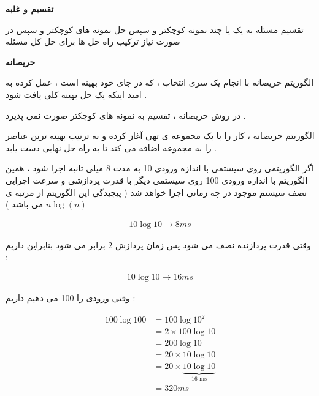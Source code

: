 \documentclass[12pt]{article}
\begin{document}
\begin{tcolorbox}
\textbf{تقسیم و غلبه}

\noindent
 تقسیم مسئله به یک یا چند نمونه کوچکتر و سپس حل نمونه های کوچکتر و سپس در صورت نیاز ترکیب راه حل ها برای حل کل مسئله
\end{tcolorbox}



\begin{tcolorbox}
\textbf{حریصانه}


\noindent
الگوریتم حریصانه با انجام یک سری انتخاب ، که در جای خود بهینه است ، عمل کرده به امید اینکه یک حل بهینه کلی یافت شود .


\noindent
در روش حریصانه ، تقسیم به نمونه های کوچکتر صورت نمی پذیرد .

\noindent
الگوریتم حریصانه ، کار را با یک مجموعه ی تهی آغاز کرده و به ترتیب بهینه ترین عناصر را به مجموعه اضافه می کند تا به راه حل نهایی دست یابد .

\end{tcolorbox}



\vspace{30pt}


\newpage

\noindent
اگر الگوریتمی روی سیستمی با اندازه ورودی 10 به مدت 8 میلی ثانیه اجرا شود ، همین الگوریتم با اندازه ورودی 100 روی سیستمی دیگر با قدرت پردازشی و سرعت اجرایی نصف سیستم موجود در چه زمانی اجرا خواهد شد ( پیچیدگی این الگوریتم از مرتبه ی 
$n\log{(n)}$
می باشد )

\begin{tcolorbox}

\begin{align*}
10\log{10} \to 8 ms
\end{align*}

وقتی قدرت پردازنده نصف می شود پس زمان پردازش 2 برابر می شود بنابراین داریم :

\begin{align*}
10\log{10} \to 16 ms
\end{align*}


وقتی ورودی را 100 می دهیم داریم :
\begin{latin}
\begin{align*}
100\log{100} &= 100\log{10^{2}} \\
&= 2 \times 100 \log{10}  \\
&= 200 \log{10} \\
&= 20 \times 10 \log{10}  \\
&= 20 \times \underbrace{10\log{10}}_{\text{16 ms}} \\
&= 320 ms
\end{align*}
\end{latin}

\end{tcolorbox}
\end{document}
